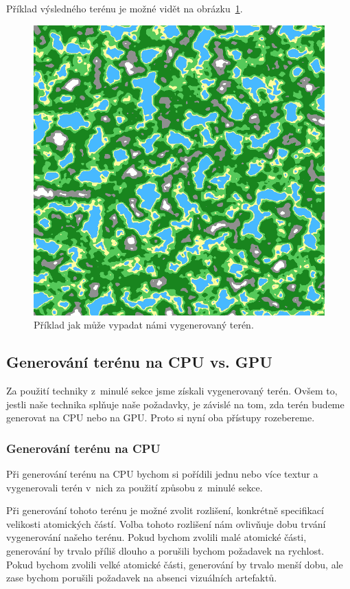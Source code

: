 Příklad výsledného terénu je možné vidět na obrázku~\ref{fig:terrain}.

\begin{figure}[!htb]
    \centering
    \includegraphics[width=0.66\linewidth]{img/terrain.png}
    \caption{Příklad jak může vypadat námi vygenerovaný terén.}
    \label{fig:terrain}
\end{figure}


\subsection{Generování terénu na CPU vs. GPU}
Za použití techniky z~minulé sekce jsme získali vygenerovaný terén. Ovšem to, jestli naše technika splňuje naše požadavky, je závislé na tom, zda terén budeme generovat na CPU nebo na GPU. Proto si nyní oba přístupy rozebereme.

\subsubsection{Generování terénu na CPU}
Při generování terénu na CPU bychom si pořídili jednu nebo více textur a vygenerovali terén v~nich za použití způsobu z~minulé sekce.

Při generování tohoto terénu je možné zvolit rozlišení, konkrétně specifikací velikosti atomických částí. Volba tohoto rozlišení nám ovlivňuje dobu trvání vygenerování našeho terénu. Pokud bychom zvolili malé atomické části, generování by trvalo příliš dlouho a porušili bychom požadavek na rychlost. Pokud bychom zvolili velké atomické části, generování by trvalo menší dobu, ale zase bychom porušili požadavek na absenci vizuálních artefaktů.

